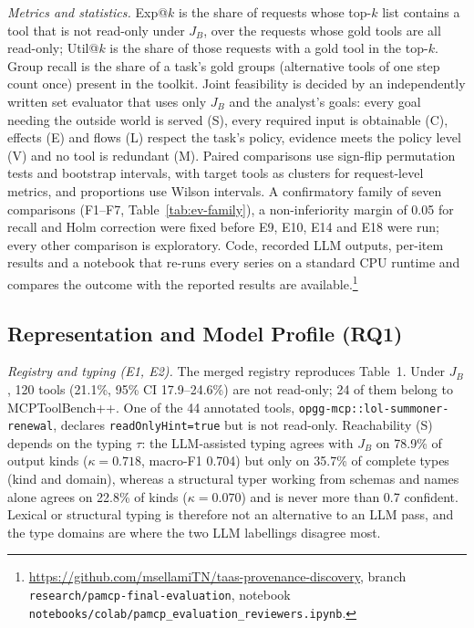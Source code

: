 \emph{Metrics and statistics.} Exp@$k$ is the share of requests whose top-$k$ list contains a tool that is not
read-only under $J_B$, over the requests whose gold tools are all read-only; Util@$k$ is the share of those
requests with a gold tool in the top-$k$. Group recall is the share of a task's gold groups (alternative tools of
one step count once) present in the toolkit. Joint feasibility is decided by an independently written set
evaluator that uses only $J_B$ and the analyst's goals: every goal needing the outside world is served (S), every
required input is obtainable (C), effects (E) and flows (L) respect the task's policy, evidence meets the policy
level (V) and no tool is redundant (M). Paired comparisons use sign-flip permutation tests and bootstrap
intervals, with target tools as clusters for request-level metrics, and proportions use Wilson intervals. A
confirmatory family of seven comparisons (F1--F7, Table~\ref{tab:ev-family}), a non-inferiority margin of 0.05
for recall and Holm correction were fixed before E9, E10, E14 and E18 were run; every other comparison is
exploratory. Code, recorded LLM outputs, per-item results and a notebook that re-runs every series on a standard
CPU runtime and compares the outcome with the reported results are
available.\footnote{\url{https://github.com/msellamiTN/taas-provenance-discovery}, branch
\texttt{research/pamcp-final-evaluation}, notebook \texttt{notebooks/colab/pamcp\_evaluation\_reviewers.ipynb}.}

\subsection{Representation and Model Profile (RQ1)}
\label{sec:ev-rq1}

\emph{Registry and typing (E1, E2).} The merged registry reproduces Table~1. Under $J_B$, 120 tools (21.1\%, 95\%
CI 17.9--24.6\%) are not read-only; 24 of them belong to MCPToolBench++. One of the 44 annotated tools,
\texttt{opgg-mcp::lol-summoner-renewal}, declares \texttt{readOnlyHint=true} but is not read-only. Reachability
(S) depends on the typing $\tau$: the LLM-assisted typing agrees with $J_B$ on 78.9\% of output kinds
($\kappa=0.718$, macro-F1 0.704) but only on 35.7\% of complete types (kind and domain), whereas a structural typer
working from schemas and names alone agrees on 22.8\% of kinds ($\kappa=0.070$) and is never more than 0.7
confident. Lexical or structural typing is therefore not an alternative to an LLM pass, and the type domains are
where the two LLM labellings disagree most.

